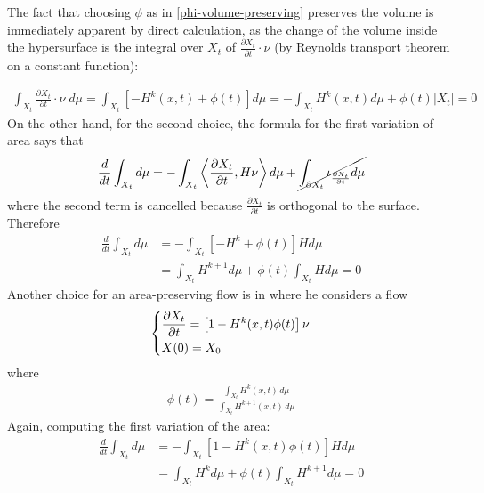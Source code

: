 The fact that choosing $\phi$ as in \ref{phi-volume-preserving} preserves the volume is immediately apparent by direct calculation, as the change of the volume inside the hypersurface is the integral over $X_t$ of $\frac{\partial X_t}{\partial t}\cdot \nu$ (by Reynolds transport theorem on a constant function): 

\begin{align*}
		\int_{X_t}\frac{\partial X_t}{\partial t}\cdot \nu \;d\mu= \int_{X_t} \left[- H^k(x, t) + \phi(t)\right] d\mu = - \int_{X_t}  H^k(x, t) d\mu + \phi(t)|X_t|=0
\end{align*}
On the other hand, for the second choice, the formula for the first variation of area says that 
\begin{align*}
	\frac{d}{d t}\int_{X_t} d\mu = -  \int_{X_t} \left\langle\frac{\partial X_t}{\partial t} , H \nu \right\rangle d\mu  +\cancel{\int_{\partial X_t}\iota_{\frac{\partial X_t}{\partial t}}  d\mu}
\end{align*}
where the second term is cancelled because $\frac{\partial X_t}{\partial t}$ is orthogonal to the surface. Therefore
\begin{align*}
	\frac{d}{d t}\int_{X_t} d\mu &= -  \int_{X_t}  \left[- H^k + \phi(t)\right] H d\mu \\
	&=  \int_{X_t}  H^{k+1} d\mu  + \phi(t)\int_{X_t} H d\mu = 0
\end{align*}
Another choice for an area-preserving flow is in \cite{mccoy} where he considers a flow 
\begin{align}
	\begin{dcases}
		\frac{\partial X_t}{\partial t} = \left[1 - H^k(x, t)\phi(t)\right] \nu\\
		X(0)= X_0
	\end{dcases} \label{mccoy equation}
\end{align}
where 
\begin{align*}
	\phi(t) = \frac{\int_{X_t} H^k(x, t) \, d\mu}{\int_{X_t} H^{k+1}(x, t) \, d\mu}
\end{align*}
Again, computing the first variation of the area:
\begin{align*}
	\frac{d}{d t}\int_{X_t} d\mu &= -  \int_{X_t}  \left[1 - H^k(x, t)\phi(t)\right] H d\mu \\
	&=  \int_{X_t}  H^k d\mu  + \phi(t)\int_{X_t} H^{k+1} d\mu = 0
\end{align*}
